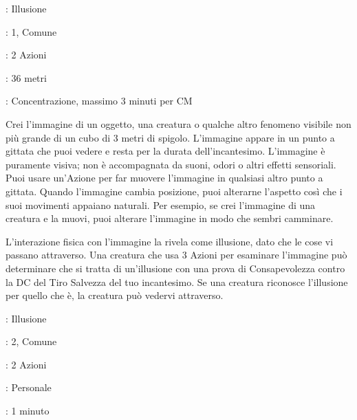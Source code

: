 \begin{multicols}{2}
\noindent\colorbox{OBSSgold!10}{
\begin{minipage}{0.95\linewidth}
\begin{description}[noitemsep, topsep=0pt, parsep=0pt, partopsep=0pt, leftmargin=0cm, labelwidth=1.3cm]
	\item[\textbf{Lista}]: Illusione
	\item[\textbf{Livello}]: 1, Comune
	\item[\textbf{Lancio}]: 2 Azioni
	\item[\textbf{Gittata}]: 36 metri
	\item[\textbf{Durata}]: Concentrazione, massimo 3 minuti per CM
\end{description}
\end{minipage}}\smallskip

Crei l'immagine di un oggetto, una creatura o qualche altro fenomeno visibile non più grande di un cubo di 3 metri di spigolo. L'immagine appare in un punto a gittata che puoi vedere e resta per la durata dell'incantesimo. L'immagine è puramente visiva; non è accompagnata da suoni, odori o altri effetti sensoriali. Puoi usare un'Azione per far muovere l'immagine in qualsiasi altro punto a gittata. Quando l'immagine cambia posizione, puoi alterarne l'aspetto così che i suoi movimenti appaiano naturali. Per esempio, se crei l'immagine di una creatura e la muovi, puoi alterare l'immagine in modo che sembri camminare.

L'interazione fisica con l'immagine la rivela come illusione, dato che le cose vi passano attraverso. Una creatura che usa 3 Azioni per esaminare l'immagine può determinare che si tratta di un'illusione con una prova di Consapevolezza contro la DC del Tiro Salvezza del tuo incantesimo. Se una creatura riconosce l'illusione per quello che è, la creatura può vedervi attraverso.

\noindent\colorbox{OBSSgold!10}{
\begin{minipage}{0.95\linewidth}
\begin{description}[noitemsep, topsep=0pt, parsep=0pt, partopsep=0pt, leftmargin=0cm, labelwidth=1.3cm]
	\item[\textbf{Lista}]: Illusione
	\item[\textbf{Livello}]: 2, Comune
	\item[\textbf{Lancio}]: 2 Azioni
	\item[\textbf{Gittata}]: Personale
	\item[\textbf{Durata}]: 1 minuto
\end{description}
\end{minipage}}\smallskip


\end{multicols}
